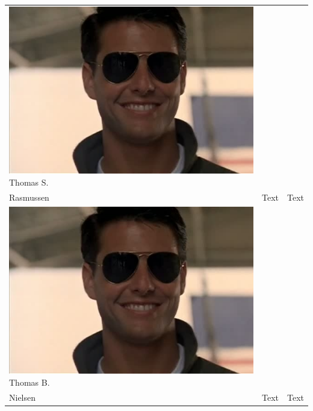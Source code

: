 \begin{tabular}[c]{|p{3cm}| p{5cm} | p{6cm}|}
	\phantom{Test}
	\includegraphics[scale=0.54]{Introduction/TeamPictures/TomC} \newline
	Thomas S.\\Rasmussen
	& Text & Text\\\hline
	
	\phantom{Test}
	\includegraphics[scale=0.54]{Introduction/TeamPictures/TomC} \newline
	Thomas B.\\Nielsen
	& Text & Text\\\hline	
\end{tabular}